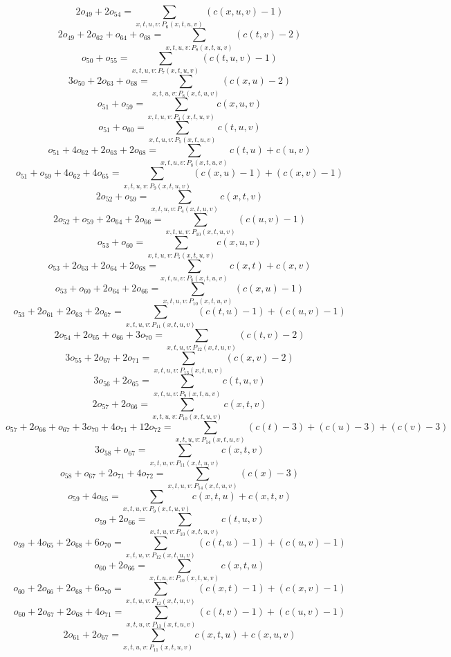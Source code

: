 \[2o_{49} + 2o_{54} = \sum\limits_{x,t,u,v:P_{6} (x,t,u,v)} ( c( x, u, v ) - 1 ) \]
\[2o_{49} + 2o_{62} + o_{64} + o_{68} = \sum\limits_{x,t,u,v:P_{8} (x,t,u,v)} ( c( t, v ) - 2 ) \]
\[o_{50} + o_{55} = \sum\limits_{x,t,u,v:P_{7} (x,t,u,v)} ( c( t, u, v ) - 1 ) \]
\[3o_{50} + 2o_{63} + o_{68} = \sum\limits_{x,t,u,v:P_{8} (x,t,u,v)} ( c( x, u ) - 2 ) \]
\[o_{51} + o_{59} = \sum\limits_{x,t,u,v:P_{4} (x,t,u,v)} c( x, u, v ) \]
\[o_{51} + o_{60} = \sum\limits_{x,t,u,v:P_{5} (x,t,u,v)} c( t, u, v ) \]
\[o_{51} + 4o_{62} + 2o_{63} + 2o_{68} = \sum\limits_{x,t,u,v:P_{8} (x,t,u,v)} c( t, u ) + c( u, v ) \]
\[o_{51} + o_{59} + 4o_{62} + 4o_{65} = \sum\limits_{x,t,u,v:P_{9} (x,t,u,v)} ( c( x, u ) - 1 ) + ( c( x, v ) - 1 ) \]
\[2o_{52} + o_{59} = \sum\limits_{x,t,u,v:P_{4} (x,t,u,v)} c( x, t, v ) \]
\[2o_{52} + o_{59} + 2o_{64} + 2o_{66} = \sum\limits_{x,t,u,v:P_{10} (x,t,u,v)} ( c( u, v ) - 1 ) \]
\[o_{53} + o_{60} = \sum\limits_{x,t,u,v:P_{5} (x,t,u,v)} c( x, u, v ) \]
\[o_{53} + 2o_{63} + 2o_{64} + 2o_{68} = \sum\limits_{x,t,u,v:P_{8} (x,t,u,v)} c( x, t ) + c( x, v ) \]
\[o_{53} + o_{60} + 2o_{64} + 2o_{66} = \sum\limits_{x,t,u,v:P_{10} (x,t,u,v)} ( c( x, u ) - 1 ) \]
\[o_{53} + 2o_{61} + 2o_{63} + 2o_{67} = \sum\limits_{x,t,u,v:P_{11} (x,t,u,v)} ( c( t, u ) - 1 ) + ( c( u, v ) - 1 ) \]
\[2o_{54} + 2o_{65} + o_{66} + 3o_{70} = \sum\limits_{x,t,u,v:P_{12} (x,t,u,v)} ( c( t, v ) - 2 ) \]
\[3o_{55} + 2o_{67} + 2o_{71} = \sum\limits_{x,t,u,v:P_{13} (x,t,u,v)} ( c( x, v ) - 2 ) \]
\[3o_{56} + 2o_{65} = \sum\limits_{x,t,u,v:P_{9} (x,t,u,v)} c( t, u, v ) \]
\[2o_{57} + 2o_{66} = \sum\limits_{x,t,u,v:P_{10} (x,t,u,v)} c( x, t, v ) \]
\[o_{57} + 2o_{66} + o_{67} + 3o_{70} + 4o_{71} + 12o_{72} = \sum\limits_{x,t,u,v:P_{14} (x,t,u,v)} ( c( t ) - 3 ) + ( c( u ) - 3 ) + ( c( v ) - 3 ) \]
\[3o_{58} + o_{67} = \sum\limits_{x,t,u,v:P_{11} (x,t,u,v)} c( x, t, v ) \]
\[o_{58} + o_{67} + 2o_{71} + 4o_{72} = \sum\limits_{x,t,u,v:P_{14} (x,t,u,v)} ( c( x ) - 3 ) \]
\[o_{59} + 4o_{65} = \sum\limits_{x,t,u,v:P_{9} (x,t,u,v)} c( x, t, u ) + c( x, t, v ) \]
\[o_{59} + 2o_{66} = \sum\limits_{x,t,u,v:P_{10} (x,t,u,v)} c( t, u, v ) \]
\[o_{59} + 4o_{65} + 2o_{68} + 6o_{70} = \sum\limits_{x,t,u,v:P_{12} (x,t,u,v)} ( c( t, u ) - 1 ) + ( c( u, v ) - 1 ) \]
\[o_{60} + 2o_{66} = \sum\limits_{x,t,u,v:P_{10} (x,t,u,v)} c( x, t, u ) \]
\[o_{60} + 2o_{66} + 2o_{68} + 6o_{70} = \sum\limits_{x,t,u,v:P_{12} (x,t,u,v)} ( c( x, t ) - 1 ) + ( c( x, v ) - 1 ) \]
\[o_{60} + 2o_{67} + 2o_{68} + 4o_{71} = \sum\limits_{x,t,u,v:P_{13} (x,t,u,v)} ( c( t, v ) - 1 ) + ( c( u, v ) - 1 ) \]
\[2o_{61} + 2o_{67} = \sum\limits_{x,t,u,v:P_{11} (x,t,u,v)} c( x, t, u ) + c( x, u, v ) \]
